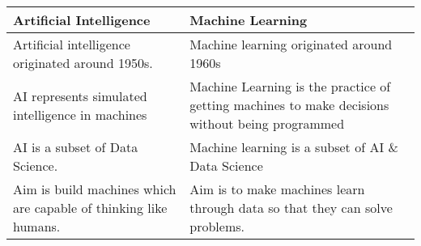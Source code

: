 \documentclass[a4paper, 12pt]{article}
\begin{document}
\begin{table}
	\centering
	\begin{tabular}{| M{3in} | M{3in} |}
	\hline
	\textbf{Artificial Intelligence} & \textbf{Machine Learning} \\ \hline
	Artificial intelligence originated around 1950s. & Machine learning originated around 1960s \\ \hline
	AI represents simulated intelligence in machines & Machine Learning is the practice of getting machines to make decisions without being programmed \\ \hline
	AI is a subset of Data Science. & Machine learning is a subset of AI \& Data Science \\ \hline
	Aim is build machines which are capable of thinking like humans. & Aim is to make machines learn through data so that they can solve problems. \\ \hline
	\end{tabular}
\end{table}
\end{document}
